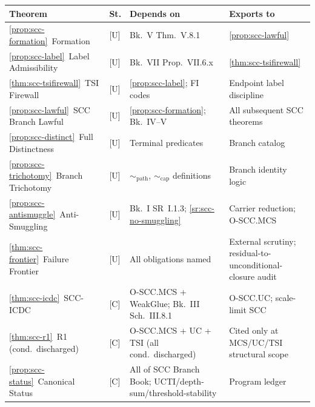 \documentclass[12pt,oneside]{amsbook}
\theoremstyle{plain}
\theoremstyle{definition}
\theoremstyle{remark}
\newcommand{\spath}{\sim_{\mathrm{path}}}
\newcommand{\scap}{\sim_{\mathrm{cap}}}
\begin{document}
\renewcommand{\arraystretch}{1.4}
\noindent
\begin{tabular}{@{}p{4.0cm}p{0.8cm}p{3.6cm}p{4.2cm}@{}}
\hline
\textbf{Theorem} & \textbf{St.} & \textbf{Depends on} & \textbf{Exports to} \\
\hline
\ref{prop:scc-formation}\ Formation
 & [U] & Bk.~V Thm.~V.8.1
 & \ref{prop:scc-lawful} \\

\ref{prop:scc-label}\ Label Admissibility
 & [U] & Bk.~VII Prop.~VII.6.x
 & \ref{thm:scc-tsifirewall} \\

\ref{thm:scc-tsifirewall}\ TSI Firewall
 & [U] & \ref{prop:scc-label}; FI codes
 & Endpoint label discipline \\

\ref{prop:scc-lawful}\ SCC Branch Lawful
 & [U] & \ref{prop:scc-formation}; Bk.~IV--V
 & All subsequent SCC theorems \\

\ref{prop:scc-distinct}\ Full Distinctness
 & [U] & Terminal predicates
 & Branch catalog \\

\ref{prop:scc-trichotomy}\ Branch Trichotomy
 & [U] & $\spath$, $\scap$ definitions
 & Branch identity logic \\

\ref{prop:scc-antismuggle}\ Anti-Smuggling
 & [U] & Bk.~I SR~I.1.3; \ref{sr:scc-no-smuggling}
 & Carrier reduction; O-SCC.MCS \\

\ref{thm:scc-frontier}\ Failure Frontier
 & [U] & All obligations named
 & External scrutiny; residual-to-unconditional-closure audit \\

\ref{thm:scc-icdc}\ SCC-ICDC
 & [C] & O-SCC.MCS + WeakGlue; Bk.~III Sch.~III.8.1
 & O-SCC.UC; scale-limit SCC \\

\ref{thm:scc-r1}\ R1 (cond.\ discharged)
 & [C] & O-SCC.MCS + UC + TSI (all cond.\ discharged)
 & Cited only at MCS/UC/TSI structural scope \\

\ref{prop:scc-status}\ Canonical Status
 & [C] & All of SCC Branch Book; UCTI/depth-sum/threshold-stability
 & Program ledger \\
\hline
\end{tabular}
\renewcommand{\arraystretch}{1}

\medskip
\end{document}
